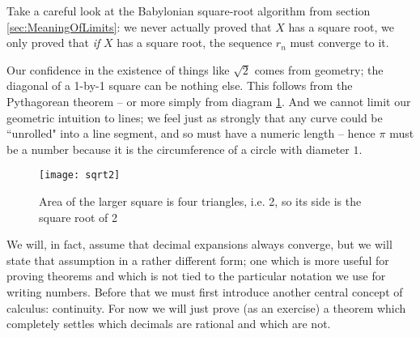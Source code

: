 Take a careful look at the Babylonian square-root algorithm from section \ref{sec:MeaningOfLimits}: we never actually proved that $X$ has a square root, we only proved that \emph{if} $X$ has a square root, the sequence $r_n$ must converge to it.

Our confidence in the existence of things like $\sqrt{2}$ comes from geometry; the diagonal of a 1-by-1 square can be nothing else. This follows from the Pythagorean theorem -- or more simply from diagram \ref{fig:sqrt2}.  And we cannot limit our geometric intuition to lines; we feel just as strongly that any curve could be ``unrolled" into a line segment, and so must have a numeric length -- hence $\pi$ must be a number because it is the circumference of a circle with diameter $1$.
\begin{figure}
\begin{center}
\texttt{[image: sqrt2]}
\end{center}
\caption{Area of the larger square is four triangles, i.e. 2, so its side is the square root of 2\label{fig:sqrt2}}
\end{figure}

We will, in fact, assume that decimal expansions always converge, but we will state that assumption in a rather different form; one which is more useful for proving theorems and which is not tied to the particular notation we use for writing numbers. Before that we must first introduce another central concept of calculus: continuity.
For now we will just prove (as an exercise) a theorem which completely settles which decimals are rational and which are not.

